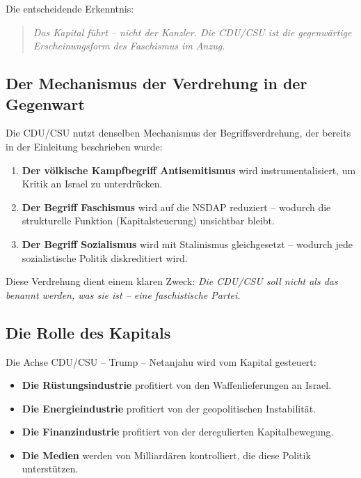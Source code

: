 Die entscheidende Erkenntnis:

\begin{quote}
\emph{Das Kapital führt – nicht der Kanzler. Die CDU/CSU ist die gegenwärtige Erscheinungsform des Faschismus im Anzug.}
\end{quote}

\subsection{Der Mechanismus der Verdrehung in der Gegenwart}

Die CDU/CSU nutzt denselben Mechanismus der Begriffsverdrehung, der bereits in der Einleitung beschrieben wurde:

\begin{enumerate}
    \item \textbf{Der völkische Kampfbegriff Antisemitismus} wird instrumentalisiert, um Kritik an Israel zu unterdrücken.
    \item \textbf{Der Begriff Faschismus} wird auf die NSDAP reduziert – wodurch die strukturelle Funktion (Kapitalsteuerung) unsichtbar bleibt.
    \item \textbf{Der Begriff Sozialismus} wird mit Stalinismus gleichgesetzt – wodurch jede sozialistische Politik diskreditiert wird.
\end{enumerate}

Diese Verdrehung dient einem klaren Zweck: \emph{Die CDU/CSU soll nicht als das benannt werden, was sie ist – eine faschistische Partei.}

\subsection{Die Rolle des Kapitals}

Die Achse CDU/CSU – Trump – Netanjahu wird vom Kapital gesteuert:

\begin{itemize}
    \item \textbf{Die Rüstungsindustrie} profitiert von den Waffenlieferungen an Israel.
    \item \textbf{Die Energieindustrie} profitiert von der geopolitischen Instabilität.
    \item \textbf{Die Finanzindustrie} profitiert von der deregulierten Kapitalbewegung.
    \item \textbf{Die Medien} werden von Milliardären kontrolliert, die diese Politik unterstützen.
\end{itemize}

